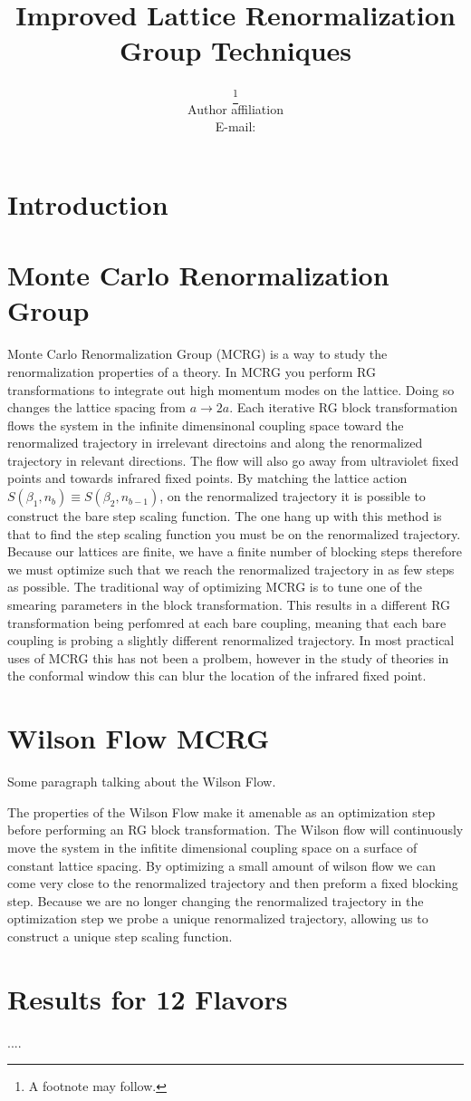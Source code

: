 \documentclass{PoS}
\title{Improved Lattice Renormalization Group Techniques}
\author{\speaker{First Author}\thanks{A footnote may follow.}\\
        Author affiliation\\
        E-mail: \email{author@email}}
\begin{document}
\section{Introduction}

\section{Monte Carlo Renormalization Group}
Monte Carlo Renormalization Group (MCRG) is a way to study the renormalization properties of a theory.
In MCRG you perform RG transformations to integrate out high momentum modes on the lattice.
Doing so changes the lattice spacing from $a \rightarrow 2a$.
Each iterative RG block transformation flows the system in the infinite dimensinonal coupling space toward the renormalized trajectory in irrelevant directoins and along the renormalized trajectory in relevant directions.
The flow will also go away from ultraviolet fixed points and towards infrared fixed points.
By matching the lattice action $S(\beta_1,n_b) \equiv S(\beta_2,n_{b-1})$, on the renormalized trajectory it is possible to construct the bare step scaling function.
The one hang up with this method is that to find the step scaling function you must be on the renormalized trajectory.
Because our lattices are finite, we have a finite number of blocking steps therefore we must optimize such that we reach the renormalized trajectory in as few steps as possible.
The traditional way of optimizing MCRG is to tune one of the smearing parameters in the block transformation.
This results in a different RG transformation being perfomred at each bare coupling, meaning that each bare coupling is probing a slightly different renormalized trajectory.
In most practical uses of MCRG this has not been a prolbem, however in the study of theories in the conformal window this can blur the location of the infrared fixed point.


\section{Wilson Flow MCRG}
Some paragraph talking about the Wilson Flow.

The properties of the Wilson Flow make it amenable as an optimization step before performing an RG block transformation.
The Wilson flow will continuously move the system in the infitite dimensional coupling space on a surface of constant lattice spacing.
By optimizing a small amount of wilson flow we can come very close to the renormalized trajectory and then preform a fixed blocking step.
Because we are no longer changing the renormalized trajectory in the optimization step we probe a unique renormalized trajectory, allowing us to construct a unique step scaling function.



\section{Results for 12 Flavors}

\begin{thebibliography}{99}
....

\end{thebibliography}
\end{document}
